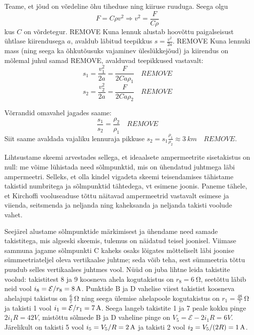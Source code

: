 \documentclass[10pt]{article}
\newcommand{\pp}[1]{REMOVE}
\begin{document}
\setAuthor{}

\solu
Teame, et jõud on võrdeline õhu tiheduse ning kiiruse ruuduga. Seega olgu 
$$F=C\rho v^2 \Rightarrow v^2=\frac{F}{C\rho}$$
kus $C$ on võrdetegur. \pp{2} Kuna lennuk alustab hoovõttu paigalseisust ühtlase kiirendusega $a$, avaldub läbitud teepikkus $s=\frac{v^2}{2a}$. \pp{1} Kuna lennuki mass (ning seega ka õhkutõusuks vajaminev üleslükkejõud) ja kiirendus on mõlemal juhul samad \pp{1}, avalduvad teepikkused vastavalt:
$$s_1=\frac{v_1^2}{2a}=\frac{F}{2Ca\rho_1}\quad\pp{1}$$ 
$$s_2=\frac{v_2^2}{2a}=\frac{F}{2Ca\rho_2}\quad\pp{1}$$   

Võrrandid omavahel jagades saame:
$$\frac{s_1}{s_2}=\frac{\rho_2}{\rho_1}\quad\pp{1}$$ 
Siit saame avaldada vajaliku lennuraja pikkuse $s_2 = s_1\frac{\rho_1}{\rho_2} \approx \SI{3}{km}\quad  \pp{1}$.
\probend
\bigskip

\setAuthor{}

\solu
Lihtsustame skeemi arvestades sellega, et ideaalsete ampermeetrite sisetakistus on null: me võime lühistada need sõlmpunktid, mis on ühendatud juhtmega läbi ampermeetri. Selleks, et olla kindel vigadeta skeemi teisendamises tähistame takistid numbritega ja sõlmpunktid tähtedega, vt esimene joonis. Paneme tähele, et Kirchoffi vooluseaduse tõttu näitavad ampermeetrid vastavalt esimese ja viienda, seitsmenda ja neljanda ning kaheksanda ja neljanda  takisti voolude vahet.

Seejärel alustame sõlmpunktide märkimisest ja ühendame need samade takistitega, mis algseski skeemis, tulemus on näidatud teisel joonisel. Viimase sammuna  jagame sõlmpunkti C kaheks osaks lõigates mõtteliselt läbi joonise sümmeetriateljel oleva vertikaalse juhtme; seda võib teha,  sest sümmeetria tõttu puudub selles vertikaalses juhtmes vool. Nüüd on juba lihtne leida takistite voolud: takistitest 8 ja 9 koosneva ahela kogutakistus on $r_8=\SI {6}\ohm$, seetõttu  läbib neid vool $i_8=\mathcal E/r_8=\SI 8A$. Punktide B ja D vahelise viiest takistist koosneva ahelajupi takistus on $\frac 67\SI {}\ohm$ ning seega ülemise ahelapoole kogutakistus on $r_1=\frac {48}7\SI {}\ohm$ ja takisti 1 vool $i_1=\mathcal E/r_1=\SI 7A$. Seega langeb takistite 1 ja 7 peale kokku pinge $2i_1R=\SI {42}V$, mistõttu sõlmede B ja D vaheline pinge on $V_5=\mathcal E-2i_1R=\SI {6}V$. Järelikult on takisti 5 vool $i_5=V_5/R=\SI 2\A$ ja takisti 2 vool $i_2=V_5/(2R)=\SI 1\A$. 
\end{document}

